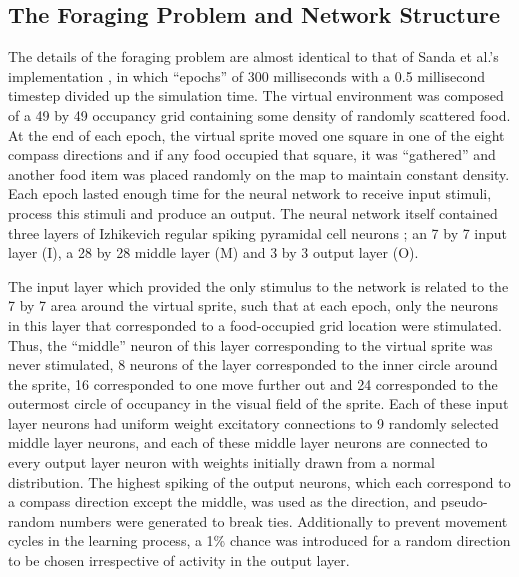 \documentclass[11pt, twocolumn]{article}
\begin{document}
\subsection*{The Foraging Problem and Network Structure}
The details of the foraging problem are almost identical to that of Sanda et al.'s implementation \cite{sanda2017multi}, in which ``epochs'' of 300 milliseconds with a 0.5 millisecond timestep divided up the simulation time. The virtual environment was composed of a 49 by 49 occupancy grid containing some density of randomly scattered food. At the end of each epoch, the virtual sprite moved one square in one of the eight compass directions and if any food occupied that square, it was ``gathered'' and another food item was placed randomly on the map to maintain constant density. Each epoch lasted enough time for the neural network to receive input stimuli, process this stimuli and produce an output. The neural network itself contained three layers of Izhikevich regular spiking pyramidal cell neurons \cite{izhikevich2007dynamical}\cite{izhikevich2008large}; an 7 by 7 input layer (I), a 28 by 28 middle layer (M) and 3 by 3 output layer (O). 

The input layer which provided the only stimulus to the network is related to the 7 by 7 area around the virtual sprite, such that at each epoch, only the neurons in this layer that corresponded to a food-occupied grid location were stimulated. Thus, the ``middle'' neuron of this layer corresponding to the virtual sprite was never stimulated, 8 neurons of the layer corresponded to the inner circle around the sprite, 16 corresponded to one move further out and 24 corresponded to the outermost circle of occupancy in the visual field of the sprite. Each of these input layer neurons had uniform weight excitatory connections to 9 randomly selected middle layer neurons, and each of these middle layer neurons are connected to every output layer neuron with weights initially drawn from a normal distribution. The highest spiking of the output neurons, which each correspond to a compass direction except the middle, was used as the direction, and pseudo-random numbers were generated to break ties. Additionally to prevent movement cycles in the learning process, a 1\% chance was introduced for a random direction to be chosen irrespective of activity in the output layer.
\end{document}
